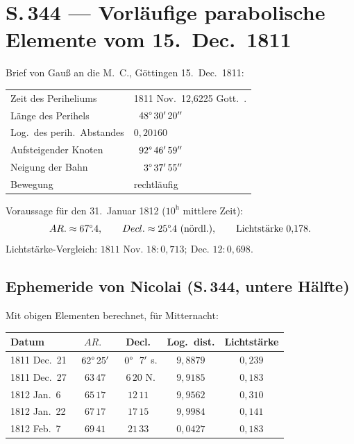 \documentclass[11pt,a4paper]{article}
\newcommand{\arcmin}{^{\prime}}
\newcommand{\arcsec}{^{\prime\prime}}
\newcommand{\Mer}{\text{Mer.}}
\newcommand{\AR}{AR.}
\newcommand{\Decl}{Decl.}
\begin{document}
\section*{S.\,344 --- Vorl\"aufige parabolische Elemente vom 15.~Dec.\ 1811}

Brief von Gau\ss{} an die M.~C., G\"ottingen 15.~Dec.\ 1811:

\begin{center}
\begin{tabular}{l l}
\toprule
Zeit des Periheliums       & 1811 Nov.\ 12,6225 Gott.\ \Mer.\\
L\"ange des Perihels       & $\phantom{0}48\degree\,30\arcmin\,20\arcsec$\\
Log.\ des perih.\ Abstandes & $0{,}20160$\\
Aufsteigender Knoten       & $\phantom{0}92\degree\,46\arcmin\,59\arcsec$\\
Neigung der Bahn           & $\phantom{00}3\degree\,37\arcmin\,55\arcsec$\\
Bewegung                   & rechtl\"aufig\\
\bottomrule
\end{tabular}
\end{center}

\noindent
Voraussage f\"ur den 31.~Januar 1812 ($10^{\mathrm{h}}$ mittlere Zeit):
\[
\AR \approx 67\degree\!.4,\qquad \Decl \approx 25\degree\!.4\ (\text{n\"ordl.}),
\qquad \text{Lichtst\"arke}\ 0{,}178.
\]
Lichtst\"arke-Vergleich:
\(\text{1811 Nov.\ 18}: 0{,}713;\ \text{Dec.\ 12}: 0{,}698.\)

\subsection*{Ephemeride von Nicolai (S.\,344, untere H\"alfte)}
Mit obigen Elementen berechnet, f\"ur Mitternacht:
\begin{center}
\begin{tabular}{l c c c c}
\toprule
Datum & $\AR$ & \Decl & Log.\ dist. & Lichtst\"arke\\
\midrule
1811 Dec.\ 21 & $\phantom{0}62\degree\,25\arcmin$ & $\phantom{0}0\degree\,\phantom{0}7\arcmin$ s. & $9{,}8879$ & $0{,}239$\\
1811 Dec.\ 27 & $\phantom{0}63\,47$               & $\phantom{0}6\,20$ N.                      & $9{,}9185$ & $0{,}183$\\
1812 Jan.\ \phantom{0}6 & $\phantom{0}65\,17$    & $12\,11$                                  & $9{,}9562$ & $0{,}310$\\
1812 Jan.\ 22 & $\phantom{0}67\,17$              & $17\,15$                                  & $9{,}9984$ & $0{,}141$\\
1812 Feb.\ \phantom{0}7 & $\phantom{0}69\,41$    & $21\,33$                                  & $0{,}0427$ & $0{,}183$\\
\bottomrule
\end{tabular}
\end{center}
\end{document}
